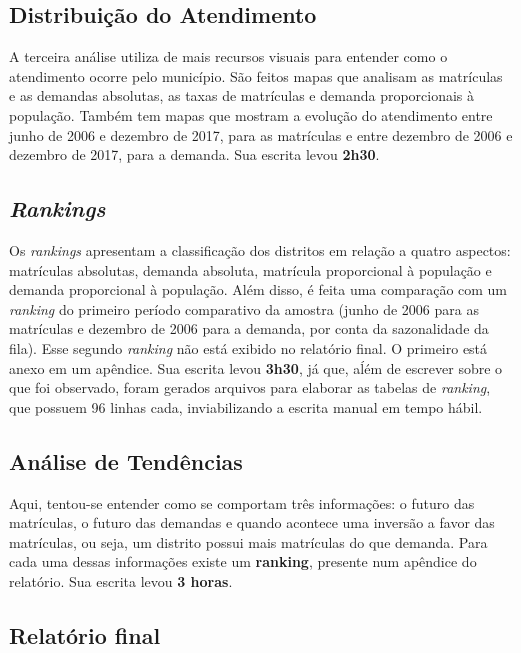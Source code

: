\documentclass[12pt, a4paper]{article}
\begin{document}
\subsection{Distribuição do Atendimento}

A terceira análise utiliza de mais recursos visuais para entender como o atendimento ocorre pelo município. São feitos mapas que analisam as matrículas e as demandas absolutas, as taxas de matrículas e demanda proporcionais à população. Também tem mapas que mostram a evolução do atendimento entre junho de 2006 e dezembro de 2017, para as matrículas e entre dezembro de 2006 e dezembro de 2017, para a demanda. Sua escrita levou \textbf{2h30}.

\subsection{\textit{Rankings}}

Os \textit{rankings} apresentam a classificação dos distritos em relação a quatro aspectos: matrículas absolutas, demanda absoluta, matrícula proporcional à população e demanda proporcional à população. Além disso, é feita uma comparação com um \textit{ranking} do primeiro período comparativo da amostra (junho de 2006 para as matrículas e dezembro de 2006 para a demanda, por conta da sazonalidade da fila). Esse segundo \textit{ranking} não está exibido no relatório final. O primeiro está anexo em um apêndice. Sua escrita levou \textbf{3h30}, já que, aĺém de escrever sobre o que foi observado, foram gerados arquivos para elaborar as tabelas de \textit{ranking}, que possuem 96 linhas cada, inviabilizando a escrita manual em tempo hábil.

\subsection{Análise de Tendências}

Aqui, tentou-se entender como se comportam três informações: o futuro das matrículas, o futuro das demandas e quando acontece uma inversão a favor das matrículas, ou seja, um distrito possui mais matrículas do que demanda. Para cada uma dessas informações existe um \textbf{ranking}, presente num apêndice do relatório. Sua escrita levou \textbf{3 horas}.

\subsection{Relatório final}
\end{document}
